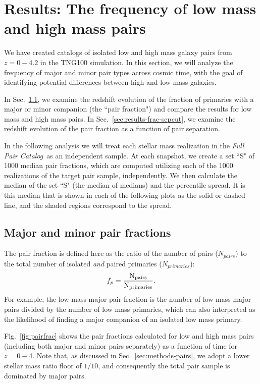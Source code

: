 \documentclass[twocolumn]{aastex631}
\newcommand{\paircat}{\textit{Full Pair Catalog}}
\begin{document}
\section{Results: The frequency of low mass and high mass pairs}
\label{sec:results}

We have created catalogs of isolated low and high mass galaxy pairs from $z=0-4.2$ in the TNG100 simulation. 
In this section, we will analyze the frequency of major and minor pair types across cosmic time, with the goal of identifying potential differences between high and low mass galaxies. 

In Sec.~\ref{sec:results-frac}, we examine the redshift evolution of the fraction of primaries with a major or minor companion (the ``pair fraction") and compare the results for low mass and high mass pairs.
In Sec.~\ref{sec:results-frac-sepcut}, we examine the redshift evolution of the pair fraction as a function of pair separation. 


In the following analysis we will treat each stellar mass realization in the \paircat\ as an independent sample. 
At each snapshot, we create a set ``S" of 1000 median pair fractions, which are computed utilizing each of the 1000 realizations of the target pair sample, independently.
We then calculate the median of the set ``S" (the median of medians) and the percentile spread. 
It is this median that is shown in each of the following plots as the solid or dashed line, and the shaded regions correspond to the spread. 

    \subsection{Major and minor pair fractions}\label{sec:results-frac}
    The pair fraction is defined here as the ratio of the number of pairs ($N_{pairs}$) to the total number of isolated \textit{and} paired primaries ($N_{primaries}$):
    $$f_{p}=\rm \frac{N_{pairs}}{N_{primaries}}.$$
    For example, the low mass major pair fraction is the number of low mass major pairs divided by the number of low mass primaries, which can also interpreted as the likelihood of finding a major companion of an isolated low mass primary. 
    
    Fig.~\ref{fig:pairfrac} shows the pair fractions calculated for low and high mass pairs (including both major and minor pairs separately) as a function of time for $z=0-4$. 
    Note that, as discussed in Sec.~\ref{sec:methods-pairs}, we adopt a lower stellar mass ratio floor of $1/10$, and consequently the total pair sample is dominated by major pairs. 
    
\end{document}
